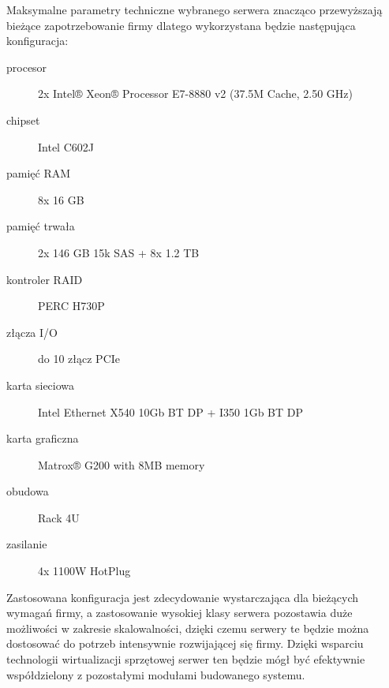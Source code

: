 Maksymalne parametry techniczne wybranego serwera znacząco
przewyższają bieżące zapotrzebowanie firmy dlatego wykorzystana
będzie następująca konfiguracja:

\begin{description}
\item[procesor] 2x Intel® Xeon® Processor E7-8880 v2 (37.5M Cache, 2.50 GHz)
\item[chipset] Intel C602J
\item[pamięć RAM] 8x 16 GB
\item[pamięć trwała] 2x 146 GB 15k SAS + 8x 1.2 TB
\item[kontroler RAID] PERC H730P
\item[złącza I/O] do 10 złącz PCIe
\item[karta sieciowa] Intel Ethernet X540 10Gb BT DP + I350 1Gb BT DP
\item[karta graficzna] Matrox® G200 with 8MB memory
\item[obudowa] Rack 4U
\item[zasilanie] 4x 1100W HotPlug
\end{description}

Zastosowana konfiguracja jest zdecydowanie wystarczająca dla
bieżących wymagań firmy, a zastosowanie wysokiej klasy serwera
pozostawia duże możliwości w zakresie skalowalności, dzięki czemu
serwery te będzie można dostosować do potrzeb intensywnie rozwijającej
się firmy. Dzięki wsparciu technologii wirtualizacji sprzętowej serwer
ten będzie mógł być efektywnie współdzielony z pozostałymi modułami
budowanego systemu.

